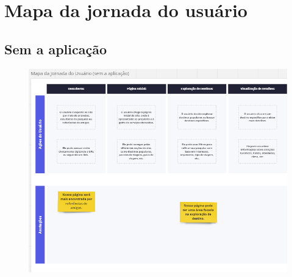 \documentclass{article}
\begin{document}
\section{Mapa da jornada do usuário}
\subsection{Sem a aplicação}

\begin{figure}[H]
      \centering
      \includegraphics [width=1\textwidth]{IMGDOC/MapaSemA1.png}
      \label{mapa sem a1}
\end{figure}
\end{document}
